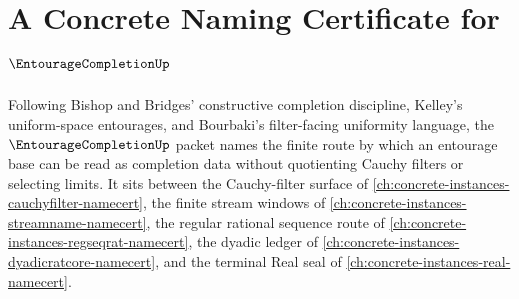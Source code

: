 \chapter{A Concrete Naming Certificate for $\EntourageCompletionUp$}
\label{ch:concrete-instances-entourage-completion-namecert}

Following Bishop and Bridges' constructive completion discipline, Kelley's
uniform-space entourages, and Bourbaki's filter-facing uniformity language, the
$\EntourageCompletionUp$ packet names the finite route by which an entourage
base can be read as completion data without quotienting Cauchy filters or
selecting limits. It sits between the Cauchy-filter surface of
\autoref{ch:concrete-instances-cauchyfilter-namecert}, the finite stream
windows of \autoref{ch:concrete-instances-streamname-namecert}, the regular
rational sequence route of
\autoref{ch:concrete-instances-regseqrat-namecert}, the dyadic ledger of
\autoref{ch:concrete-instances-dyadicratcore-namecert}, and the terminal Real
seal of \autoref{ch:concrete-instances-real-namecert}.

